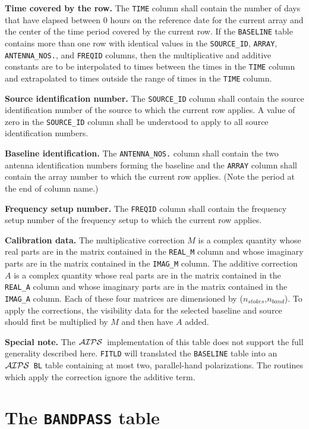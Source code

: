 \documentclass[twoside]{article}
\newcommand{\AIPS}{{$\cal AIPS\/$}}
\newcommand{\nstokes}{$n_{stokes}$}
\newcommand{\nband}{$n_{band}$}
\begin{document}
{\bf Time covered by the row.}  The {\tt TIME} column shall contain
the number of days that have elapsed between 0 hours on the reference
date for the current array and the center of the time period covered
by the current row.  If the {\tt BASELINE} table contains more than
one row with identical values in the {\tt SOURCE\_ID}, {\tt ARRAY},
{\tt ANTENNA\_NOS.}, and {\tt FREQID} columns, then the multiplicative
and additive constants are to be interpolated to times between the
times in the {\tt TIME} column and extrapolated to times outside the
range of times in the {\tt TIME} column.

{\bf Source identification number.}  The {\tt SOURCE\_ID} column shall
contain the source identification number of the source to which the
current row applies.  A value of zero in the {\tt SOURCE\_ID} column
shall be understood to apply to all source identification numbers.

{\bf Baseline identification.}  The {\tt ANTENNA\_NOS.} column shall
contain the two antenna identification numbers forming the baseline
and the {\tt ARRAY} column shall contain the array number to which the
current row applies.  (Note the period at the end of column name.)

{\bf Frequency setup number.}  The {\tt FREQID} column shall contain
the frequency setup number of the frequency setup to which the current
row applies.

{\bf Calibration data.}  The multiplicative correction $M$ is a
complex quantity whose real parts are in the matrix contained in the
{\tt REAL\_M} column and whose imaginary parts are in the matrix
contained in the {\tt IMAG\_M} column.  The additive correction $A$ is
a complex quantity whose real parts are in the matrix contained in
the {\tt REAL\_A} column and whose imaginary parts are in the matrix
contained in the {\tt IMAG\_A} column.  Each of these four matrices are
dimensioned by (\nstokes,\nband).  To apply the corrections, the
visibility data for the selected baseline and source should first be
multiplied by $M$ and then have $A$ added.

{\bf Special note.}  The \AIPS\ implementation of this table does not
support the full generality described here.  {\tt FITLD} will
translated the {\tt BASELINE} table into an \AIPS\ {\tt BL} table
containing at most two, parallel-hand polarizations.  The routines
which apply the correction ignore the additive term.

\section{The {\tt BANDPASS} table}
\label{s:BP}
\end{document}
